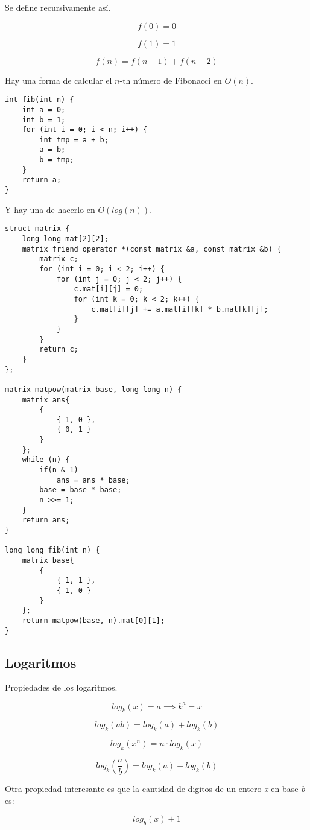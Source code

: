 \documentclass[10pt]{article}
\begin{document}
Se define recursivamente así.

\[ f(0) = 0 \]

\[ f(1) = 1 \]

\[ f(n) = f(n - 1) + f(n - 2) \]

Hay una forma de calcular el $n$-th número de Fibonacci en $O(n)$.

\begin{lstlisting}
int fib(int n) {
    int a = 0;
    int b = 1;
    for (int i = 0; i < n; i++) {
        int tmp = a + b;
        a = b;
        b = tmp;
    }
    return a;
}
\end{lstlisting}

Y hay una de hacerlo en $O(log(n))$.

\begin{lstlisting}
struct matrix {
    long long mat[2][2];
    matrix friend operator *(const matrix &a, const matrix &b) {
        matrix c;
        for (int i = 0; i < 2; i++) {
            for (int j = 0; j < 2; j++) {
                c.mat[i][j] = 0;
                for (int k = 0; k < 2; k++) {
                    c.mat[i][j] += a.mat[i][k] * b.mat[k][j];
                }
            }
        }
        return c;
    }
};

matrix matpow(matrix base, long long n) {
    matrix ans{
        {
            { 1, 0 },
            { 0, 1 }
        }
    };
    while (n) {
        if(n & 1)
            ans = ans * base;
        base = base * base;
        n >>= 1;
    }
    return ans;
}

long long fib(int n) {
    matrix base{
        {
            { 1, 1 },
            { 1, 0 }
        }
    };
    return matpow(base, n).mat[0][1];
}
\end{lstlisting}

\subsection{Logaritmos}

Propiedades de los logaritmos.

\[ log_k(x) = a \implies k^a = x \]

\[ log_k(ab) = log_k(a) + log_k(b) \]

\[ log_k(x^n) = n \cdot log_k(x) \]

\[ log_k(\frac{a}{b}) = log_k(a) - log_k(b) \]

Otra propiedad interesante es que la cantidad de digitos de un entero \textit{x} en base \textit{b} es:

\[ log_b(x) + 1 \]
\end{document}

